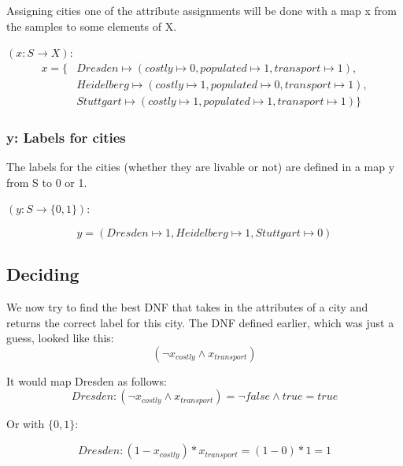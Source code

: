 \documentclass{article}
\begin{document}
Assigning cities one of the attribute assignments will be done with a map x from the samples to some elements of X.

$(x: S \rightarrow X)$:
\begin{equation*}
    \begin{split}
        x = \{&Dresden \mapsto (costly \mapsto 0, populated \mapsto 1, transport \mapsto 1), \\
        &Heidelberg \mapsto (costly \mapsto 1, populated \mapsto 0, transport \mapsto 1), \\
        &Stuttgart \mapsto (costly \mapsto 1, populated \mapsto 1, transport \mapsto 1)\}
    \end{split}
\end{equation*}

\subsubsection{y: Labels for cities}

The labels for the cities (whether they are livable or not) are defined in a map y from S to 0 or 1.

$(y: S \rightarrow \{0, 1\})$:

\begin{equation*}
    y = (Dresden \mapsto 1, Heidelberg \mapsto 1, Stuttgart \mapsto 0)
\end{equation*}

\subsection{Deciding}
We now try to find the best DNF that takes in the attributes of a city and returns the correct label for this city.
The DNF defined earlier, which was just a guess, looked like this:
\begin{equation*}
    (\lnot x_{costly} \land x_{transport})
\end{equation*}

It would map Dresden as follows:
\begin{equation*}
    Dresden: (\lnot x_{costly} \land x_{transport}) = \lnot false \land true = true       
\end{equation*}

Or with $\{0, 1\}$:

\begin{equation*}
    Dresden: (1 - x_{costly}) * x_{transport} = (1 - 0) * 1 = 1       
\end{equation*}
\end{document}
